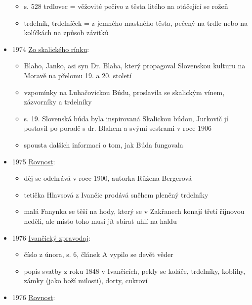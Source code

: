 \begin{itemize}
  \begin{itemize}
  \tightlist
  \item
    s. 528 trdlovec = věžovité pečivo z těsta litého na otáčející se
    rožeň
  \item
    trdelník, trdelníček = z jemného mastného těsta, pečený na trdle
    nebo na kolíčkách na způsob závitků
  \end{itemize}
\item
  1974
  \href{https://dikda.snk.sk/uuid/uuid:1a7c4454-d0d7-4b19-8ca8-1f1e1bda6ad7}{Zo
  skalického rínku}:

  \begin{itemize}
  \tightlist
  \item
    Blaho, Janko, asi syn Dr. Blaha, který propagoval Slovenskou kulturu
    na Moravě na přelomu 19. a 20. století
  \item
    vzpomínky na Luhačovickou Búdu, proslavila se skalickým vínem,
    zázvorníky a trdelníky
  \item
    s. 19. Slovenská búda byla inspirovaná Skalickou búdou, Jurkovič jí
    postavil po poradě s dr. Blahem a svými sestrami v roce 1906
  \item
    spousta dalších informací o tom, jak Búda fungovala
  \end{itemize}
\item
  1975
  \href{https://ceskadigitalniknihovna.cz/view/uuid:b23f9410-20b3-11ee-a8bd-005056827e51?page=uuid\%3A00d297d0-20cd-11ee-9137-005056822549&fulltext=trdeln\%C3\%ADk\%20OR\%20trdeln\%C3\%ADky\%20OR\%20trdeln\%C3\%ADk\%C5\%AF&source=mzk}{Rovnost}:

  \begin{itemize}
  \tightlist
  \item
    děj se odehrává v roce 1900, autorka Růžena Bergerová
  \item
    tetička Hlavsová z Ivančic prodává sněhem pleněný trdelníky
  \item
    malá Fanynka se těší na hody, který se v Zakřanech konají třetí
    říjnovou neděli, ale místo toho musí jít sbírat uhlí na haldu
  \end{itemize}
\item
  1976
  \href{https://ceskadigitalniknihovna.cz/view/uuid:ed1e8590-5937-11e2-b816-001018b5eb5c?page=uuid:42702f2d-2ffb-ed27-fb9d-4071dce2a1d8&fulltext=trdeln\%C3\%ADk\%20OR\%20trdeln\%C3\%ADky\%20OR\%20trdeln\%C3\%ADku\%20&source=mzk}{Ivančický
  zpravodaj}:

  \begin{itemize}
  \tightlist
  \item
    číslo z února, s. 6, článek A vypilo se devět věder
  \item
    popis svatby z roku 1848 v Ivančicích, pekly se koláče, trdelníky,
    koblihy, zámky (jako boží milosti), dorty, cukroví
  \end{itemize}
\item
  1976
  \href{https://ceskadigitalniknihovna.cz/view/uuid:c28d9bc0-d57e-11ee-8ea1-5ef3fc9bb22f?page=uuid\%3A97237c77-34d2-4422-98b3-6d767baeb2bd&fulltext=trdeln\%C3\%ADk\%20OR\%20trdeln\%C3\%ADky\%20OR\%20trdeln\%C3\%ADk\%C5\%AF&source=mzk}{Rovnost}:


\end{itemize}
